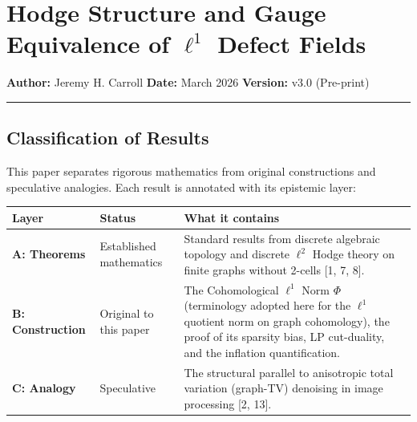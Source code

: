 \documentclass[
]{article}
\author{}
\date{}
\begin{document}
\section{\texorpdfstring{Hodge Structure and Gauge Equivalence of
\(\ell^1\) Defect
Fields}{Hodge Structure and Gauge Equivalence of \textbackslash ell\^{}1 Defect Fields}}\label{hodge-structure-and-gauge-equivalence-of-ell1-defect-fields}

\textbf{Author:} Jeremy H. Carroll \textbf{Date:} March 2026
\textbf{Version:} v3.0 (Pre-print)

\begin{center}\rule{0.5\linewidth}{0.5pt}\end{center}

\subsection{Classification of Results}\label{classification-of-results}

This paper separates rigorous mathematics from original constructions
and speculative analogies. Each result is annotated with its epistemic
layer:

\begin{longtable}[]{@{}
  >{\raggedright\arraybackslash}p{}
  >{\raggedright\arraybackslash}p{}
  >{\raggedright\arraybackslash}p{}@{}}
\toprule\noalign{}
\begin{minipage}[b]{\linewidth}\raggedright
Layer
\end{minipage} & \begin{minipage}[b]{\linewidth}\raggedright
Status
\end{minipage} & \begin{minipage}[b]{\linewidth}\raggedright
What it contains
\end{minipage} \\
\midrule\noalign{}
\endhead
\bottomrule\noalign{}
\endlastfoot
\textbf{A: Theorems} & Established mathematics & Standard results from
discrete algebraic topology and discrete \(\ell^2\) Hodge theory on
finite graphs without 2-cells {[}1, 7, 8{]}. \\
\textbf{B: Construction} & Original to this paper & The Cohomological
\(\ell^1\) Norm \(\Phi\) (terminology adopted here for the \(\ell^1\)
quotient norm on graph cohomology), the proof of its sparsity bias, LP
cut-duality, and the inflation quantification. \\
\textbf{C: Analogy} & Speculative & The structural parallel to
anisotropic total variation (graph-TV) denoising in image processing
{[}2, 13{]}. \\
\end{longtable}
\end{document}
